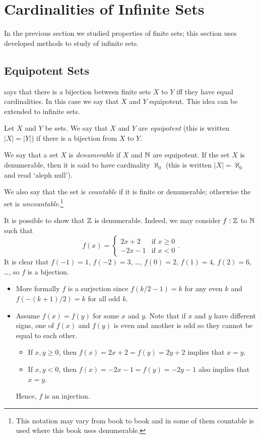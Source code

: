 \chapter{Cardinalities of Infinite Sets}
In the previous section we studied properties of finite sets; this section
uses developed methods to study of infinite sets.

\section{Equipotent Sets}

 says that there is a bijection between
finite sets $X$ to $Y$ iff they have equal cardinalities. In this case we say
that $X$ and $Y$ equipotent.
This idea can be extended to infinite sets.
\begin{definition}
  Let $X$ and $Y$ be sets. We say that $X$ and $Y$ are \emph{equipotent} (this
  is written $|X| = |Y|$) if there is a bijection from $X$ to $Y$.

  We say that a set $X$ is \emph{denumerable} if $X$ and ${\mathbb{N}}$ are equipotent.
  If the set $X$ is denumerable, then it is said to have cardinality $\aleph_0$
  (this is written $|X| = \aleph_0$ and read `aleph null').

  We also say that the set is \emph{countable} if it is finite or denumerable;
  otherwise the set is \emph{uncountable}.\footnote{%
    This notation may vary from book to book and in some of them countable is
    used where this book uses denumerable.
  }
\end{definition}

It is possible to show that ${\mathbb{Z}}$ is denumerable. Indeed, we may consider $f :
{\mathbb{Z}}$ to ${\mathbb{N}}$ such that 
\[
  f(x) = 
  \begin{cases}
    2x + 2 & \text{if } x \ge 0 \\
    -2x - 1 & \text{if } x < 0
  \end{cases}.
\]
It is clear that $f(-1) = 1$, $f(-2) = 3$, \dots, $f(0) = 2$, $f(1) = 4$, $f(2)
= 6$, \dots, so $f$ is a bijection.
\begin{itemize}
  \item More formally $f$ is a surjection since $f(k / 2 - 1) = k$ for any even
    $k$ and $f(-(k + 1) / 2) = k$ for all odd $k$.
  \item Assume $f(x) = f(y)$ for some $x$ and $y$. Note that if $x$ and
    $y$ have different signs, one of $f(x)$ and $f(y)$ is even and another is
    odd so they cannot be equal to each other.
    \begin{itemize}
      \item If $x, y \ge 0$, then $f(x) = 2x + 2 = f(y) = 2y + 2$ implies that
        $x = y$.
      \item If $x, y < 0$, then $f(x) = -2x - 1= f(y) = -2y - 1$ also implies
        that $x = y$.
    \end{itemize}
    Hence, $f$ is an injection.
\end{itemize}

